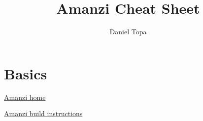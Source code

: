\documentclass[11pt, oneside]{article}
\title{Amanzi Cheat Sheet}
\author{Daniel Topa}
\begin{document}
\maketitle

\section{Basics}

\href{https://github.com/amanzi/amanzi}{Amanzi home}

\href{https://docs.google.com/document/d/1D7gASTdnYbvzK4CLqumhebFXBOW_JlkaoaFzL7WYB_8/edit?usp=sharing}{Amanzi build instructions}
\end{document}
